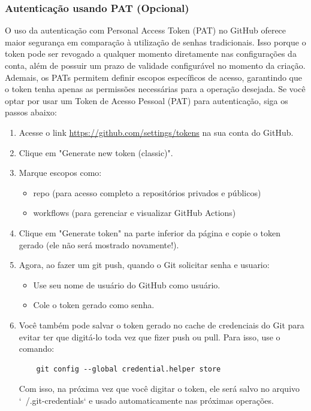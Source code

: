 \subsubsection{Autenticação usando PAT (Opcional)}
O uso da autenticação com Personal Access Token (PAT) no GitHub oferece maior segurança em comparação à utilização de senhas tradicionais. Isso porque o token pode ser revogado a qualquer momento diretamente nas configurações da conta, além de possuir um prazo de validade configurável no momento da criação.
Ademais, os PATs permitem definir escopos específicos de acesso, garantindo que o token tenha apenas as permissões necessárias para a operação desejada.
Se você optar por usar um Token de Acesso Pessoal (PAT) para autenticação, siga os passos abaixo:
\begin{enumerate}
  \item Acesse o link \url{https://github.com/settings/tokens} na sua conta do GitHub.
  \item Clique em "Generate new token (classic)".
  \item Marque escopos como:
  \begin{itemize}
    \item repo (para acesso completo a repositórios privados e públicos)
    \item  workflows (para gerenciar e visualizar GitHub Actions)
  \end{itemize}
  \item Clique em "Generate token" na parte inferior da página e copie o token gerado (ele não será mostrado novamente!).
  \item Agora, ao fazer um git push, quando o Git solicitar senha e usuario:
  \begin{itemize}
    \item Use seu nome de usuário do GitHub como usuário.
    \item Cole o token gerado como senha.
  \end{itemize}
  \item Você também pode salvar o token gerado no cache de credenciais do Git para evitar ter que digitá-lo toda vez que fizer push ou pull. Para isso, use o comando:
  \begin{verbatim}
    git config --global credential.helper store
  \end{verbatim}
  Com isso, na próxima vez que você digitar o token, ele será salvo no arquivo `~/.git-credentials` e usado automaticamente nas próximas operações.
\end{enumerate}
\par

